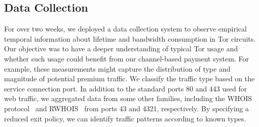 \subsection{Data Collection}
\label{subsec:datacollection}

For over two weeks, we deployed a data collection system to observe empirical temporal information about lifetime and bandwidth consumption in Tor circuits.
Our objective was to have a deeper understanding of typical Tor usage and whether such usage could benefit from our channel-based payment system.
For example, these measurements might capture the distribution of type and magnitude of potential premium traffic.
We classify the traffic type based on the service connection port.
In addition to the standard ports 80 and 443 used for web traffic, we aggregated data from some other families, including the WHOIS protocol~\cite{daigle2004whois} and RWHOIS~\cite{williamson1994referral} from ports 43 and 4321, respectively.
By specifying a reduced exit policy, we can identify traffic patterns according to known types.

